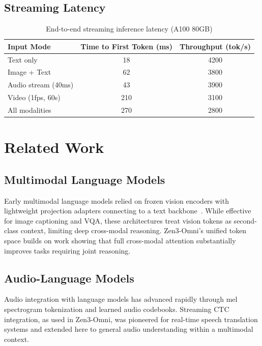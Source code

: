 \documentclass[11pt,a4paper]{article}
\begin{document}
\subsection{Streaming Latency}

\begin{table}[H]
\centering
\caption{End-to-end streaming inference latency (A100 80GB)}
\begin{tabular}{lcc}
\toprule
\textbf{Input Mode} & \textbf{Time to First Token (ms)} & \textbf{Throughput (tok/s)} \\
\midrule
Text only             &  18 & 4200 \\
Image + Text          &  62 & 3800 \\
Audio stream (40ms)   &  43 & 3900 \\
Video (1fps, 60s)     & 210 & 3100 \\
All modalities        & 270 & 2800 \\
\bottomrule
\end{tabular}
\label{tab:latency}
\end{table}

\section{Related Work}
\label{sec:related}

\subsection{Multimodal Language Models}

Early multimodal language models relied on frozen vision encoders with lightweight
projection adapters connecting to a text backbone~\cite{llava}. While effective for
image captioning and VQA, these architectures treat vision tokens as second-class
context, limiting deep cross-modal reasoning. Zen3-Omni's unified token space builds
on work showing that full cross-modal attention substantially improves tasks requiring
joint reasoning.

\subsection{Audio-Language Models}

Audio integration with language models has advanced rapidly through mel spectrogram
tokenization and learned audio codebooks. Streaming CTC integration, as used in
Zen3-Omni, was pioneered for real-time speech translation systems and extended here
to general audio understanding within a multimodal context.
\end{document}
